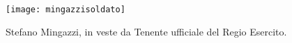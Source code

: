  \begin{figure}[htb]
    \centering
    \texttt{[image: mingazzisoldato]}
    \caption[Stefano Mingazzi in divisa militare]{Stefano Mingazzi, in veste da Tenente ufficiale del Regio Esercito.\label{fig:mingazzisoldato}}
    \vspace{-0.8cm}
\end{figure}